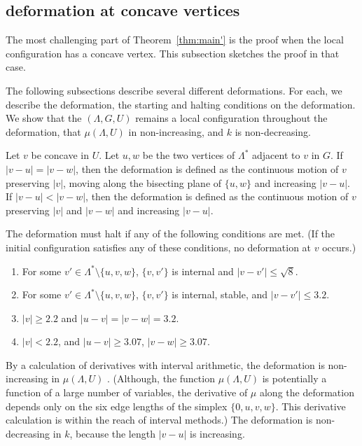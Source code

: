 \subsection{deformation at concave vertices}\label{sec:concave}

The most challenging part  of Theorem~\ref{thm:main'} is the
proof when the local configuration has a concave vertex.  This subsection
sketches the proof in that case.

The following subsections describe several different  deformations.  For each,
we describe the deformation, the starting and halting conditions on 
the deformation.  We show that the $(\Lambda,G,U)$ remains a local
configuration throughout the deformation, 
 that  $\mu(\Lambda,U)$ in non-increasing, and $k$ is
non-decreasing.


Let $v$ be concave in $U$.  Let $u,w$ be the two vertices of
$\Lambda^*$ adjacent to $v$ in $G$. 
If $|v-u|=|v-w|$, then the deformation is defined as the continuous motion
of $v$ preserving $|v|$,  moving along the bisecting plane of $\{u,w\}$
and increasing $|v-u|$.  If $|v-u|<|v-w|$, then the deformation
is defined as the continuous motion of $v$ preserving $|v|$ and
$|v-w|$ and increasing $|v-u|$.

The deformation must halt if any of the following conditions
are met.  (If the initial configuration satisfies any of these conditions,
no deformation at $v$ occurs.)
\begin{enumerate}\label{e:halt}
\item For some $v'\in\Lambda^*\setminus\{u,v,w\}$, 
$\{v,v'\}$ is internal and $|v-v'|\le \sqrt8$.
\item For some $v'\in\Lambda^*\setminus\{u,v,w\}$,
$\{v,v'\}$ is internal, stable, and $|v-v'|\le 3.2$.
\item $|v|\ge 2.2$ and $|u-v|=|v-w|=3.2$.  
\item $|v|< 2.2$, 
and $|u-v|\ge 3.07$, $|v-w|\ge 3.07$.
\end{enumerate}

By a calculation of derivatives with interval arithmetic,
the deformation is non-increasing in $\mu(\Lambda,U)$ \cite[Lemma~7.7]{arx}.  (Although, the function $\mu(\Lambda,U)$ is potentially a 
function of a large number of variables, the derivative of $\mu$
along the deformation depends only on the six edge lengths  of
the simplex $\{0,u,v,w\}$.  This derivative calculation is within
the reach of interval methods.)
The deformation is non-decreasing in $k$, because the length
$|v-u|$ is increasing.

